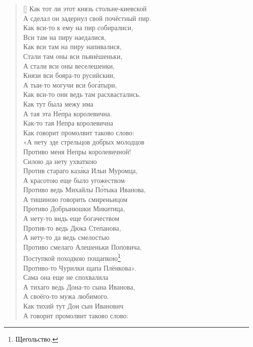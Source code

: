 \settowidth{\versewidth}{А не стрели-тко ты меня Непры королевичной.} 
\begin{verse}[\versewidth]
Как тот ли этот князь стольне-киевской\\
А сделал он задернул свой почёстный пир.\\
Как вси-то к ему на пир собиралиси,\\
Вси там на пиру наедалися,\\
Как вси там на пиру напивалися,\\
Стали там оны вси пьянёшеньки,\\
А стали вси оны веселешенки,\\
Князи вси бояра-то русийскии,\\
А тыи-то могучи вси бог\'атыри,\\
Как вси-то они ведь там расхвастались.\\
Как тут была межу има\\
А тая эта Н\'епра королевична.\\
Как-то тая Непра королевична\\
Как говорит промолвит таково слово:\\
«А нету зде стрельцов добрых молодцов\\
Противо меня Непры королевичной!\\
Силою да нету ухваткою\\
Против стараго каз\'ака Ильи Муромца,\\
А красотою еще было угожеством\\
Противо ведь Михайлы П\'отыка Иванова,\\
А тишиною говорить смиреньицом\\
Противо Добрынюшки Микитица,\\
А нету-то видь еще богачеством\\
Против-то ведь Дюка Степанова,\\
А нету-то да ведь смелостью\\
Противо смелаго Алешеньки Поповича,\\
Поступкой походкою пощапкою\footnote{Щегольство.}\\
Противо-то Чурилки щапа Плёнкова».\\
Сама она еще не спохвалила\\
А тихаго ведь Дона-то сына Иванова,\\
А своёго-то мужа любимого.\\
Как тихий тут Дон сын Иванович \\
А говорит промолвит таково слово:\\

\end{verse}
